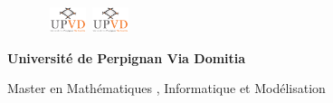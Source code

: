 

\newpage
\pagestyle{empty}
\begin{titlepage}

\begin{figure}[htbp]
 \hbox{
     \includegraphics[width=40]{images/2.png}
     \hspace*{12.5cm}
     \includegraphics[width=40]{images/2.png}
 }
\end{figure}

\vspace {-1.8cm}

\begin{center}
{\bf Universit\'{e} de Perpignan Via Domitia \\
	\vspace{0.3cm}
   
Master en Mathématiques , Informatique et Modélisation } \vspace{0.2cm}\\


\end{center}
\end{titlepage}
